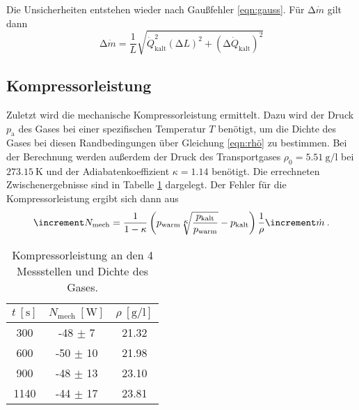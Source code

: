 Die Unsicherheiten entstehen wieder nach Gaußfehler \ref{eqn:gauss}.
Für $\increment \dot{m}$ gilt dann
\begin{equation}
  \increment \dot{m} = \frac{1}{L} \sqrt{\dot{Q}_\text{kalt}^2 (\increment L)^2
  + (\increment \dot{Q}_\text{kalt})^2}
\end{equation}

\subsection{Kompressorleistung}
Zuletzt wird die mechanische Kompressorleistung ermittelt. Dazu wird der Druck
$p_\text{a}$ des Gases bei einer spezifischen Temperatur $T$ benötigt, um die
Dichte des Gases bei diesen Randbedingungen über Gleichung \eqref{eqn:rhö} zu
bestimmen. Bei der Berechnung werden außerdem der Druck des Transportgases
$\rho_0 = \SI{5.51}{\gram\per\litre}$ bei $\SI{273.15}{\kelvin}$ und der
Adiabatenkoeffizient $\kappa = 1.14$ benötigt.
Die errechneten Zwischenergebnisse sind in Tabelle \ref{tab:leistungN}
dargelegt.
Der Fehler für die Kompressorleistung ergibt sich dann aus
\begin{equation}
  \increment N_\text{mech} = \frac{1}{1 - \kappa} \left(p_\text{warm}
  \sqrt[\leftroot{-1}\uproot{-1}\scriptstyle \kappa]{\frac{p_\text{kalt}}
  {p_\text{warm}}} - p_\text{kalt} \right) \frac{1}{\rho} \increment \dot{m} \:.
\end{equation}

\begin{table}
      \centering
      \caption{Kompressorleistung an den 4 Messstellen und Dichte des Gases.}
      \label{tab:leistungN}
      \begin{tabular}{c c c}
            \toprule
            {$t \: [\si{\second}]$} & {$N_\text{mech} \: [\si{\watt}]$}
            & {$\rho \: [\si{\gram\per\litre}]$} \\
            \midrule
            300  & -48 $\pm$  7 & 21.32 \\
            600  & -50 $\pm$ 10 & 21.98 \\
            900  & -48 $\pm$ 13 & 23.10 \\
            1140 & -44 $\pm$ 17 & 23.81 \\
            \bottomrule
      \end{tabular}
\end{table}
